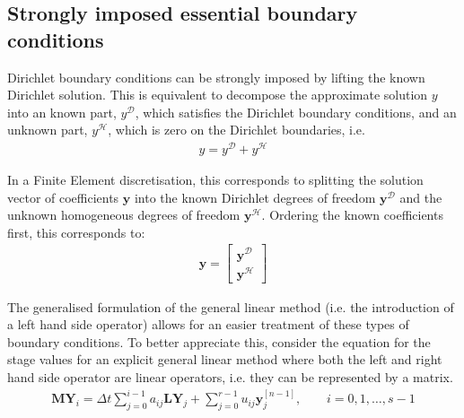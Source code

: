 
\subsection{Strongly imposed essential boundary conditions}
Dirichlet boundary conditions can be strongly imposed by lifting the known
Dirichlet solution.
This is equivalent to decompose the approximate solution $y$ into an
known part, $y^{\mathcal{D}}$, which satisfies the Dirichlet boundary
conditions, and an unknown part, $y^{\mathcal{H}}$, which is zero on
the Dirichlet boundaries, i.e.
\begin{align*}
y = y^{\mathcal{D}} + y^{\mathcal{H}}
\end{align*}

In a Finite Element discretisation, this corresponds to splitting the solution
vector of coefficients $\boldsymbol{y}$ into the known Dirichlet
degrees of freedom $\boldsymbol{y}^{\mathcal{D}}$ and the unknown
homogeneous degrees of freedom $\boldsymbol{y}^{\mathcal{H}}$.
Ordering the known coefficients first, this corresponds to:
\begin{align*}
\boldsymbol{y} = \left[ \begin{array}{c}
\boldsymbol{y}^{\mathcal{D}} \\
\boldsymbol{y}^{\mathcal{H}} \end{array} \right]
\end{align*}

The generalised formulation of the general linear method (i.e. the introduction
of a left hand side operator) allows for an easier treatment of these types of
boundary conditions. To better appreciate this, consider the equation for the
stage values for an explicit general linear method where both the left and right
hand side operator are linear operators, i.e. they can be represented by a
matrix.
\begin{align*}
\boldsymbol{M}\boldsymbol{Y}_i = \Delta
t\sum_{j=0}^{i-1}a_{ij}\boldsymbol{L}\boldsymbol{Y}_j+\sum_{j=0}^{r-1}u_{ij}\boldsymbol{y}_{j}^{[n-1]},
\qquad i=0,1,\ldots,s-1
\end{align*}

